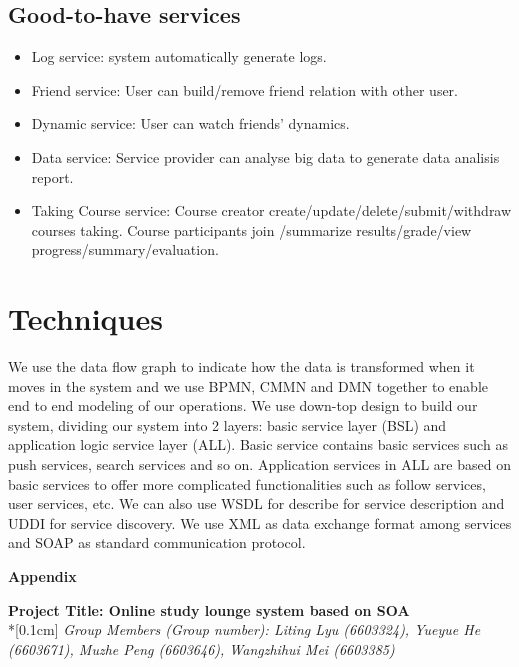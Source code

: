 \documentclass[runningheads]{llncs}
\begin{document}
\subsection*{Good-to-have services}
\begin{itemize}
    \item Log service: system automatically generate logs.
    \item Friend service: User can build/remove friend relation with other user.
    \item Dynamic service: User can watch friends' dynamics.
    \item Data service: Service provider can analyse big data to generate data analisis report.
    \item Taking Course service: Course creator create/update/delete/submit/withdraw courses taking. Course participants join /summarize results/grade/view progress/summary/evaluation.
\end{itemize}

\section*{Techniques}
We use the data flow graph to indicate how the data is transformed when it moves in the system and we use BPMN, CMMN and DMN  together to enable end to end modeling of our operations.
We use down-top design to build our system, dividing our system into 2 layers: basic service layer (BSL) and application logic service layer (ALL). Basic service contains basic services such as push services, search services and so on. Application services in ALL are based on basic services to offer more complicated functionalities such as follow services, user services, etc. We can also use WSDL for describe for service description and UDDI for service discovery. We use XML as data exchange format among services and SOAP as standard communication protocol.
\clearpage
\begin{flushleft}
    \huge{\textbf{Appendix}}
    \end{flushleft}
    \begin{center}
    \Large{\textbf{Project Title: Online study lounge system based on SOA }} \\*[0.1cm]%
    \large{\emph{Group Members (Group number): Liting Lyu (6603324), Yueyue  He (6603671), Muzhe Peng (6603646), Wangzhihui Mei (6603385)}} %
    \end{center}
    
\end{document}
